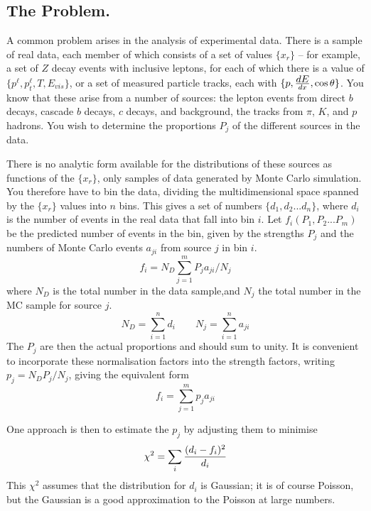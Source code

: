 \subsection*{The Problem.}
 
A common problem arises in the analysis of experimental
data.   There is a sample of real data, each member of which
consists of a set of values $\{x_r\}$ -- for example, a set of $Z$ decay
events with
inclusive leptons, for each of which there is a value of
$\{p^\ell, p_t^\ell, T, E_{vis}\}$, or a set of measured particle
tracks, each with
$\{p,{\textstyle dE\over dx},\cos\theta\}$.   You know that these arise from
a number of sources: the lepton events  from direct $b$ decays, cascade $b$ decays,
$c$ decays, and background, the tracks from $\pi$, $K$, and $p$ hadrons.
You wish to determine the proportions $P_j$ of the different sources
in the data.
 
There is no analytic form available for the
distributions of these sources as  functions
of the $\{x_r\}$, only samples of data
generated by Monte Carlo simulation.
You therefore have to bin the data, dividing the
multidimensional
space spanned by the $\{x_r\}$
values into $n$ bins.    This gives
a set of numbers $\{d_1,d_2...d_n\}$, where $d_i$ is the number
of events in the real data that fall into
bin $i$.   Let $f_i(P_1,P_2...P_m)$ be
the predicted number of events in the bin, given
by the strengths $P_j$ and the numbers  of
Monte Carlo events $a_{ji}$ from source $j$ in bin $i$.
\begin{equation}
f_i = N_D \sum_{j=1}^m P_j a_{ji}/N_j \label{mcmixone}
\end{equation}
where $N_D$ is the total number in the data sample,and $N_j$
the total number in the MC sample for source $j$.
\begin{equation}
N_D= \sum_{i=1}^n d_i\qquad N_j=\sum_{i=1}^n a_{ji} \label{totals}
\end{equation}
The $P_j$ are then the actual proportions and should sum to unity.
It is convenient to
incorporate these normalisation factors into the
strength factors, writing $p_j=N_D P_j/N_j$, giving
the equivalent form
\begin{equation}
f_i = \sum_{j=1}^m p_j a_{ji} \label{mcmixtwo}
\end{equation}
 
One approach is then to
estimate the $p_j$ by adjusting them to minimise
\begin{equation}
\chi^2 = \sum_i
{(d_i-f_i)^2 \over d_i } \label{chisq}
\end{equation}
This $\chi^2$ assumes that
the distribution for $d_i$ is Gaussian; it is of course Poisson,
but the Gaussian is a good approximation to the Poisson at large numbers.
 
